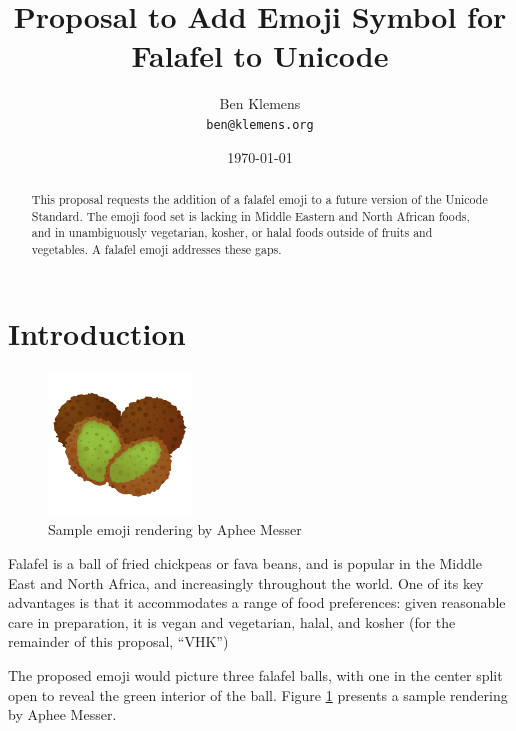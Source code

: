 \documentclass[a4paper,10pt]{article}
\begin{document}




\title{Proposal to Add Emoji Symbol for {\sc Falafel} to Unicode}
\author{Ben Klemens\\ {\tt ben@klemens.org}}
\date{\today}
\maketitle

\begin{abstract}
This proposal requests the addition of a {\sc falafel} emoji to a future version of the
Unicode Standard.  The emoji food set is lacking in Middle Eastern and North African
foods, and in unambiguously vegetarian, kosher, or halal foods outside of fruits and
vegetables. A falafel emoji addresses these gaps.
\end{abstract}


\section{Introduction}

\begin{figure}
\begin{center}
\includegraphics[width=1.5in]{falafel.png}
\end{center}
\caption{Sample emoji rendering by Aphee Messer}
\label{apheefig}
\end{figure}

{\sc Falafel} is a ball of fried chickpeas or fava beans, and is popular in the Middle East
and North Africa, and increasingly throughout the world.  One of its key advantages is
that it accommodates a range of food preferences: given reasonable care in preparation,
it is vegan and vegetarian, halal, and kosher (for the remainder of this proposal, ``VHK'')

The proposed emoji would picture three falafel balls, with one in the center split open to
reveal the green interior of the ball. Figure \ref{apheefig} presents a sample rendering by Aphee Messer.
\end{document}
